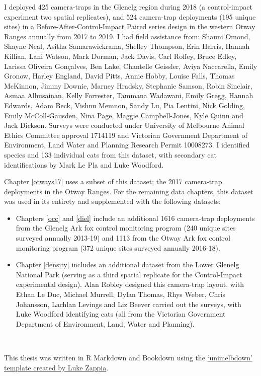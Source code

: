 \documentclass[11pt,a4paper,titlepage,twoside,openright]{style/unimelbthesis}
\begin{document}
\begin{frontmatter}
\begin{preface}
    I deployed 425 camera-traps in the Glenelg region during 2018 (a control-impact experiment two spatial replicates), and 524 camera-trap deployments (195 unique sites) in a Before-After-Control-Impact Paired series design in the western Otway Ranges annually from 2017 to 2019. I had field assistance from: Shauni Omond, Shayne Neal, Asitha Samarawickrama, Shelley Thompson, Erin Harris, Hannah Killian, Lani Watson, Mark Dorman, Jack Davis, Carl Roffey, Bruce Edley, Larissa Oliveira Gonçalves, Ben Lake, Chantelle Geissler, Aviya Naccarella, Emily Gronow, Harley England, David Pitts, Annie Hobby, Louise Falls, Thomas McKinnon, Jimmy Downie, Marney Hradsky, Stephanie Samson, Robin Sinclair, Asmaa Alhusainan, Kelly Forrester, Tammana Wadawani, Emily Gregg, Hannah Edwards, Adam Beck, Vishnu Memnon, Sandy Lu, Pia Lentini, Nick Golding, Emily McColl-Gausden, Nina Page, Maggie Campbell-Jones, Kyle Quinn and Jack Dickson. Surveys were conducted under University of Melbourne Animal Ethics Committee approval 1714119 and Victorian Government Department of Environment, Land Water and Planning Research Permit 10008273. I identified species and 133 individual cats from this dataset, with secondary cat identifications by Mark Le Pla and Luke Woodford.
    
    Chapter \ref{otways17} uses a subset of this dataset; the 2017 camera-trap deployments in the Otway Ranges. For the remaining data chapters, this dataset was used in its entirety and supplemented with the following datasets:
    \begin{itemize}
    \item
      Chapters \ref{occ} and \ref{diel} include an additional 1616 camera-trap deployments from the Glenelg Ark fox control monitoring program (240 unique sites surveyed annually 2013-19) and 1113 from the Otway Ark fox control monitoring program (372 unique sites surveyed annually 2016-18).
    \item
      Chapter \ref{density} includes an additional dataset from the Lower Glenelg National Park (serving as a third spatial replicate for the Control-Impact experimental design). Alan Robley designed this camera-trap layout, with Ethan Le Duc, Michael Murrell, Dylan Thomas, Rhys Weber, Chris Johansson, Lachlan Levings and Liz Beever carried out the surveys, with Luke Woodford identifying cats (all from the Victorian Government Department of Environment, Land, Water and Planning).
    \end{itemize}
    \(~\)
    
    This thesis was written in R Markdown and Bookdown using the \href{https://github.com/lazappi/unimelbdown}{`unimelbdown' template created by Luke Zappia}.
    

\end{preface}
\end{frontmatter}
\end{document}
